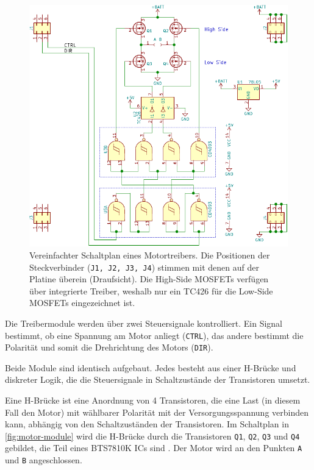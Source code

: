 \documentclass[german]{thesis_KBS}
\newcommand{\code}[1]{\texttt{#1}}  %
\begin{document}
\begin{figure}[!ht]
    \centering \includegraphics[width=15cm]{kicad/motor-module/motor-module-cropped.pdf}
    \caption{Vereinfachter Schaltplan eines Motortreibers. Die Positionen der
        Steckverbinder (\code{J1, J2, J3, J4}) stimmen mit denen auf der Platine
        überein (Draufsicht). Die High-Side MOSFETs verfügen über integrierte
        Treiber, weshalb nur ein TC426 für die Low-Side MOSFETs eingezeichnet
        ist.}
    \label{fig:motor-module}
\end{figure}

Die Treibermodule werden über zwei Steuersignale kontrolliert. Ein Signal
bestimmt, ob eine Spannung am Motor anliegt (\code{CTRL}), das andere bestimmt
die Polarität und somit die Drehrichtung des Motors (\code{DIR}).

Beide Module sind identisch aufgebaut. Jedes besteht aus einer H-Brücke und
diskreter Logik, die die Steuersignale in Schaltzustände der Transistoren
umsetzt.


Eine H-Brücke ist eine Anordnung von 4 Transistoren, die eine Last (in diesem
Fall den Motor) mit wählbarer Polarität mit der Versorgungsspannung verbinden
kann, abhängig von den Schaltzuständen der Transistoren. Im Schaltplan in
\autoref{fig:motor-module} wird die H-Brücke durch die Transistoren
\code{Q1}, \code{Q2}, \code{Q3} und \code{Q4} gebildet, die Teil eines BTS7810K
ICs sind \cite{h-bridge-datasheet}. Der Motor wird an den Punkten \code{A} und
\code{B} angeschlossen.
\end{document}
